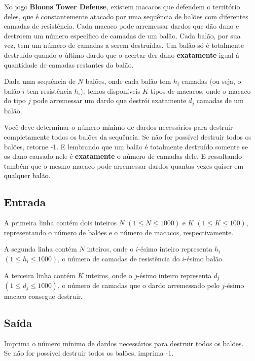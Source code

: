 No jogo \textbf{Bloons Tower Defense}, existem macacos que defendem o território deles, que é constantemente atacado por uma sequência de balões com diferentes camadas de resistência. Cada macaco pode arremessar dardos que dão dano e destroem um número específico de camadas de um balão. Cada balão, por sua vez, tem um número de camadas a serem destruídas. Um balão só é totalmente destruído quando o último dardo que o acertar der dano \textbf{exatamente} igual à quantidade de camadas restantes do balão.

Dada uma sequência de $N$ balões, onde cada balão tem $h_i$ camadas (ou seja, o balão $i$ tem resistência $h_i$), temos disponíveis $K$ tipos de macacos, onde o macaco do tipo $j$ pode arremessar um dardo que destrói exatamente $d_j$ camadas de um balão.

Você deve determinar o número mínimo de dardos necessários para destruir completamente todos os balões da sequência. Se não for possível destruir todos os balões, retorne -1. E lembrando que um balão é totalmente destruído somente se os dano causado nele é \textbf{exatamente} o número de camadas dele. E ressaltando também que o mesmo macaco pode arremessar dardos quantas vezes quiser em qualquer balão.

\subsection*{Entrada}
    A primeira linha contém dois inteiros $N$ $(1 \leq N \leq 1000)$ e $K$ $(1 \leq K \leq 100)$, representando o número de balões e o número de macacos, respectivamente.

    A segunda linha contém $N$ inteiros, onde o $i$-ésimo inteiro representa $h_i$ $(1 \leq h_i \leq 1000)$, o número de camadas de resistência do $i$-ésimo balão.

    A terceira linha contém $K$ inteiros, onde o $j$-ésimo inteiro representa $d_j$ $(1 \leq d_j \leq 1000)$, o número de camadas que o dardo arremessado pelo $j$-ésimo macaco consegue destruir.

\subsection*{Saída}
Imprima o número mínimo de dardos necessários para destruir todos os balões. Se não for possível destruir todos os balões, imprima -1.

